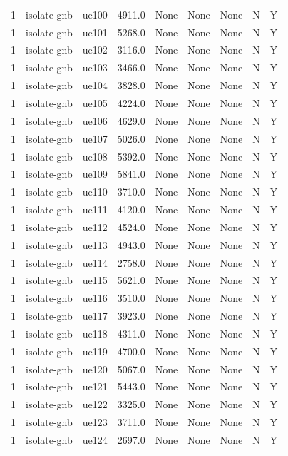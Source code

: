 \begin{table}[ht]
\begin{tabular}{|c|c|c|c|c|c|c|c|c|}
1 & isolate-gnb & ue100 & 4911.0 & None & None & None & N & Y \\
1 & isolate-gnb & ue101 & 5268.0 & None & None & None & N & Y \\
1 & isolate-gnb & ue102 & 3116.0 & None & None & None & N & Y \\
1 & isolate-gnb & ue103 & 3466.0 & None & None & None & N & Y \\
1 & isolate-gnb & ue104 & 3828.0 & None & None & None & N & Y \\
1 & isolate-gnb & ue105 & 4224.0 & None & None & None & N & Y \\
1 & isolate-gnb & ue106 & 4629.0 & None & None & None & N & Y \\
1 & isolate-gnb & ue107 & 5026.0 & None & None & None & N & Y \\
1 & isolate-gnb & ue108 & 5392.0 & None & None & None & N & Y \\
1 & isolate-gnb & ue109 & 5841.0 & None & None & None & N & Y \\
1 & isolate-gnb & ue110 & 3710.0 & None & None & None & N & Y \\
1 & isolate-gnb & ue111 & 4120.0 & None & None & None & N & Y \\
1 & isolate-gnb & ue112 & 4524.0 & None & None & None & N & Y \\
1 & isolate-gnb & ue113 & 4943.0 & None & None & None & N & Y \\
1 & isolate-gnb & ue114 & 2758.0 & None & None & None & N & Y \\
1 & isolate-gnb & ue115 & 5621.0 & None & None & None & N & Y \\
1 & isolate-gnb & ue116 & 3510.0 & None & None & None & N & Y \\
1 & isolate-gnb & ue117 & 3923.0 & None & None & None & N & Y \\
1 & isolate-gnb & ue118 & 4311.0 & None & None & None & N & Y \\
1 & isolate-gnb & ue119 & 4700.0 & None & None & None & N & Y \\
1 & isolate-gnb & ue120 & 5067.0 & None & None & None & N & Y \\
1 & isolate-gnb & ue121 & 5443.0 & None & None & None & N & Y \\
1 & isolate-gnb & ue122 & 3325.0 & None & None & None & N & Y \\
1 & isolate-gnb & ue123 & 3711.0 & None & None & None & N & Y \\
1 & isolate-gnb & ue124 & 2697.0 & None & None & None & N & Y \\

\end{tabular}
\end{table}
